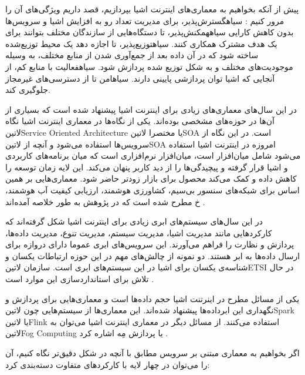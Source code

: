 
پیش از آنکه بخواهیم به معماری‌های اینترنت اشیا بپردازیم، قصد داریم ویژگی‌های آن را مرور کنیم
:
 ‌سیاه{گسترش‌پذیر}، برای مدیریت تعداد رو به افزایش اشیا و سرویس‌ها بدون کاهش کارایی
 ‌سیاه{همکنش‌پذیر}، تا دستگاه‌هایی از سازندگان مختلف بتوانند برای یک هدف مشترک همکاری کنند.
 ‌سیاه{توزیع‌پذیر}، تا اجازه دهد یک محیط توزیع‌شده ساخته شود که در آن داده بعد از جمع‌آوری شدن از منابع مختلف، به وسیله موجودیت‌های مختلف و به شکل توزیع شده پردازش شود.
 ‌سیاه{فعالیت با منابع کم}، از آنجایی که اشیا توان پردازشی پایینی دارند.
 ‌سیاه{امن} تا از دسترسی‌های غیرمجاز جلوگیری کند.

در این سال‌های معماری‌های زیادی برای اینترنت اشیا پیشنهاد شده است که بسیاری از آن‌ها در حوزه‌های مشخصی بوده‌اند.
یکی از نگاه‌ها در معماری اینترنت اشیا نگاه ‌لاتین{Service Oriented Architecture} یا مختصرا ‌لاتین{SOA} است.
در این نگاه از سرویس‌ها استفاده می‌شود و آنچه از ‌لاتین{SOA} امروزه در اینترنت اشیا استفاده می‌شود شامل میان‌افزار است، میان‌افزار نرم‌افزاری است که
میان برنامه‌های کاربردی و اشیا قرار گرفته و پیچیدگی‌ها را از دید کاربر پنهان می‌کند. این لایه زمان توسعه را کاهش داده و کمک می‌کند محصول برای بازار
زودتر حاضر شود. معماری‌هایی بر همین اساس برای شبکه‌های سنسور بی‌سیم، کشاورزی هوشمند، ارزیابی کیفیت آب هوشمند، ‌خ مطرح شده است که در پژوهش  به طور خلاصه آمده‌اند
.

در این سال‌های سیستم‌های ابری زیادی برای اینترنت اشیا شکل گرفته‌اند که کارکردهایی مانند مدیریت اشیا، مدیریت سیستم، مدیریت تنوع، مدیریت داده‌ها، پردازش و
نظارت را فراهم می‌آورند. این سرویس‌های ابری عموما دارای دروازه برای ارسال داده‌ها به ابر هستند. دو نمونه از چالش‌های مهم در این حوزه ارتباطات یکسان و
شناسه‌ی یکسان برای اشیا در این سیستم‌های ابری است. سازمان ‌لاتین{ETSI} در حال تلاش برای استانداردسازی این موارد است
.

یکی از مسائل مطرح در اینرتنت اشیا حجم داده‌ها است و معماری‌هایی برای پردازش و نگهداری این ابرداده‌ها پیشنهاد شده‌اند. این معماری‌ها از سیستم‌هایی چون ‌لاتین{Spark} یا ‌لاتین{Flink} استفاده می‌کنند.
از مسائل دیگر در معماری اینترنت اشیا می‌توان به ‌لاتین{Fog Computing} یا پردازش مِه اشاره کرد
.

اگر بخواهیم به معماری مبتنی بر سرویس مطابق با آنچه در شکل  دقیق‌تر نگاه کنیم، آن را می‌توان در چهار لایه با کارکردهای متفاوت دسته‌بندی کرد:


